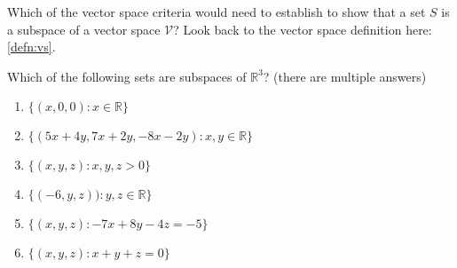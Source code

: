 \begin{problem}
    Which of the vector space criteria would need to establish to show that a set $S$ is a
    subspace of a vector space $\mathcal{V}$?  Look back to the vector space definition here:
    \ref{defn:vs}.
\end{problem}



\begin{problem}
Which of the following sets are subspaces of $\mathbb{R}^3$? (there are multiple
       answers)
       \begin{enumerate}
           \item $\{(x,0,0) : x \in \mathbb{R} \}$
           \item $\{(5x+4y, 7x+2y,-8x-2y) : x,y \in \mathbb{R}\}$
           \item $\{(x,y,z) : x,y,z > 0\}$
           \item $\{(-6,y,z)) : y,z\in\mathbb{R}\}$
           \item $\{(x,y,z) : -7x + 8y - 4z = -5 \}$
           \item $\{(x,y,z) : x+y+z=0\}$
       \end{enumerate}
\end{problem}


